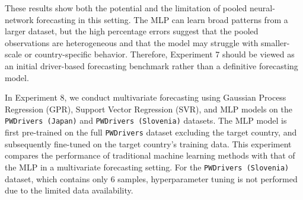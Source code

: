 These results show both the potential and the limitation of pooled neural-network forecasting in this setting. The MLP can learn broad patterns from a larger dataset, but the high percentage errors suggest that the pooled observations are heterogeneous and that the model may struggle with smaller-scale or country-specific behavior. Therefore, Experiment 7 should be viewed as an initial driver-based forecasting benchmark rather than a definitive forecasting model.


In Experiment 8, we conduct multivariate forecasting using Gaussian Process Regression (GPR), Support Vector Regression (SVR), and MLP models on the \texttt{PWDrivers (Japan)} and \texttt{PWDrivers (Slovenia)} datasets. The MLP model is first pre-trained on the full \texttt{PWDrivers} dataset excluding the target country, and subsequently fine-tuned on the target country's training data. This experiment compares the performance of traditional machine learning methods with that of the MLP in a multivariate forecasting setting. For the \texttt{PWDrivers (Slovenia)} dataset, which contains only \(6\) samples, hyperparameter tuning is not performed due to the limited data availability.



